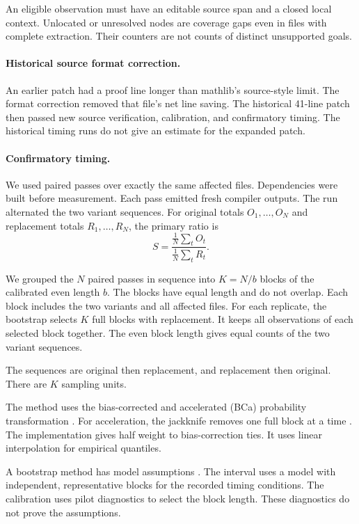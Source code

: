 An eligible observation must have an editable source span and a closed local context.
Unlocated or unresolved nodes are coverage gaps even in files with complete extraction.
Their counters are not counts of distinct unsupported goals.


\FloatBarrier

\paragraph{Historical source format correction.}
An earlier patch had a proof line longer than mathlib's source-style limit.
The format correction removed that file's net line saving.
The historical 41-line patch then passed new source verification, calibration, and confirmatory timing.
The historical timing runs do not give an estimate for the expanded patch.

\paragraph{Confirmatory timing.}
We used paired passes over exactly the same affected files.
Dependencies were built before measurement.
Each pass emitted fresh compiler outputs.
The run alternated the two variant sequences.
For original totals $O_1,\ldots,O_N$ and replacement totals $R_1,\ldots,R_N$, the primary ratio is
\[
 S=\frac{\frac1N\sum_tO_t}{\frac1N\sum_tR_t}.
\]

We grouped the $N$ paired passes in sequence into $K=N/b$ blocks of the calibrated even length $b$.
The blocks have equal length and do not overlap.
Each block includes the two variants and all affected files.
For each replicate, the bootstrap selects $K$ full blocks with replacement.
It keeps all observations of each selected block together.
The even block length gives equal counts of the two variant sequences.

The sequences are original then replacement, and replacement then original.
There are $K$ sampling units.

The method uses the bias-corrected and accelerated (BCa) probability transformation \citep{efron1987}.
For acceleration, the jackknife removes one full block at a time \citep{diciccioefron1996}.
The implementation gives half weight to bias-correction ties.
It uses linear interpolation for empirical quantiles.

A bootstrap method has model assumptions \citep{fieldwelsh2007}.
The interval uses a model with independent, representative blocks for the recorded timing conditions.
The calibration uses pilot diagnostics to select the block length.
These diagnostics do not prove the assumptions.

